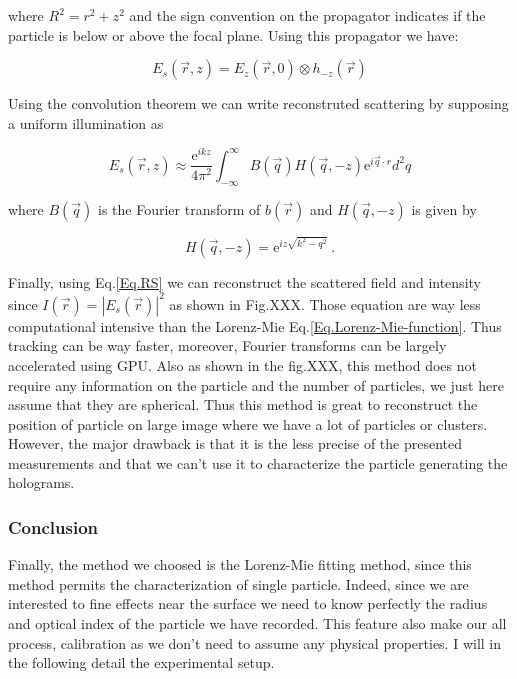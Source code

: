 where $ R^2 = r^2 + z^2 $ and the sign convention on the propagator indicates if the particle is below or above the focal plane. Using this propagator we have:

\begin{equation}
	E_s(\vec{r}, z) = E_z(\vec{r}, 0) \otimes h_{-z}(\vec{r})
\end{equation}

Using the convolution theorem \cite{cheong_strategies_2010, goodman_introduction_2005, sherman_application_1967,schnars_digital_1994} we can write reconstruted scattering by supposing a uniform illumination as 

\begin{equation}
	E_s(\vec{r}, z) \approx \frac{\mathrm{e}^{ikz}}{4\pi ^2}
	\int ^\infty _{- \infty}
	B(\vec{q}) H(\vec{q}, -z) \mathrm{e}^{i \vec{q} \cdot r} d^2 q
	\label{Eq.RS}
\end{equation}

where $B(\vec{q})$ is the Fourier transform of $b(\vec{r})$ and $H(\vec{q}, -z)$ is given by

\begin{equation}
	H(\vec{q}, -z) = \mathrm{e}^{iz \sqrt{k^2 - q^2}} ~.
\end{equation}

Finally, using Eq.\ref{Eq.RS} we can reconstruct the scattered field and intensity since $I(\vec{r}) = |E_s(\vec{r})|^2$ as shown in Fig.XXX. 
Those equation are way less computational intensive than the Lorenz-Mie Eq.\ref{Eq.Lorenz-Mie-function}. Thus tracking can be way faster, moreover, Fourier transforms can be largely accelerated using GPU. Also as shown in the fig.XXX, this method does not require any information on the particle and the number of particles, we just here assume that they are spherical. Thus this method is great to reconstruct the position of particle on large image where we have a lot of particles or clusters. However, the major drawback is that it is the less precise of the presented measurements and that we can't use it to characterize the particle generating the holograms.

\subsubsection{Conclusion}

Finally, the method we choosed is the Lorenz-Mie fitting method, since this method permits the characterization of single particle. Indeed, since we are interested to fine effects near the surface we need to know perfectly the radius and optical index of the particle we have recorded. This feature also make our all process, calibration as we don't need to assume any physical properties. I will in the following detail the experimental setup.


